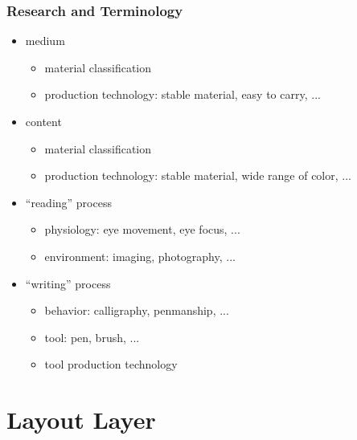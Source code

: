 \documentclass{beamer}
\begin{document}
	\begin{frame}
		\frametitle{Research and Terminology}

		\begin{itemize}
			\item medium
			\begin{itemize}
                \item material classification
                \item production technology: stable material, easy to carry, ...
            \end{itemize}
            \item content
			\begin{itemize}
                \item material classification
                \item production technology: stable material, wide range of color, ...
            \end{itemize}
            \item ``reading'' process
			\begin{itemize}
                \item physiology: eye movement, eye focus, ...
                \item environment: imaging, photography, ...
            \end{itemize}
            \item ``writing'' process
			\begin{itemize}
                \item behavior: calligraphy, penmanship, ...
                \item tool: pen, brush, ...
                \item tool production technology
            \end{itemize}
		\end{itemize}
	\end{frame}
    
	
    \section{Layout Layer}
\end{document}

